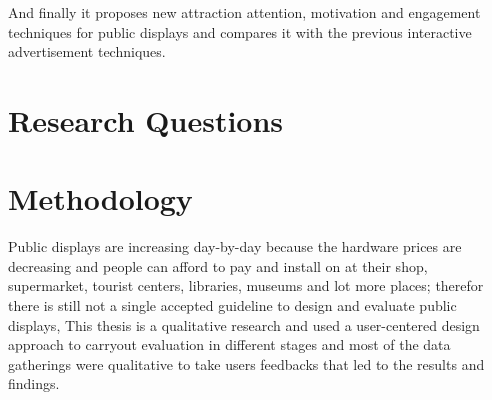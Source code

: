 And finally it proposes new attraction attention, motivation and engagement techniques for public displays and compares it with the previous interactive advertisement techniques.

\section{Research Questions}



\begin{table}[H]
\caption{Summary of Research Questions }
\label{tab:summaryofresearchquestions}
\end{table}



\section{Methodology}
Public displays are increasing day-by-day because the hardware prices are decreasing and people can afford to pay and install on at their shop, supermarket, tourist centers, libraries, museums and lot more places; therefor there is still not a single accepted guideline to design and evaluate public displays, This thesis is a qualitative research and used a user-centered design approach to carryout evaluation in different stages and most of the data gatherings were qualitative to take users feedbacks that led to the results and findings.


